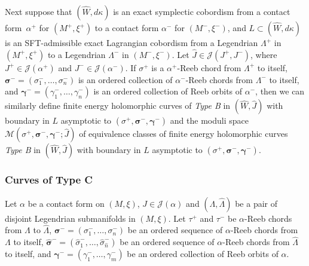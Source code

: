 \documentclass[JEP,XML,SOM,Unicode,NoFloatCountersInSection]{cedram}
\let\mathcal\mathscr
\theoremstyle{plain}
\theoremstyle{definition}
\numberwithin{equation}{subsection}
\let\bs\boldsymbol
\begin{document}
Next suppose that $(\widehat W,d\kappa)$ is an exact symplectic cobordism from a contact form~$\alpha^+$ for $(M^+,\xi^+)$ to a contact form $\alpha^-$ for $(M^-,\xi^-)$, and $L \subset (\widehat W,d\kappa)$ is an SFT-admissible exact Lagrangian cobordism from a Legendrian $\Lambda^+$ in $(M^+,\xi^+)$ to a Legendrian $\Lambda^-$ in $(M^-,\xi^-)$. Let $\widehat{J}\in \mathcal{J}(J^+,J^-)$, where $J^+ \in \mathcal{J}(\alpha^+)$ and $J^- \in \mathcal{J}(\alpha^-)$. If $\sigma^+$ is a $\alpha^+$-Reeb chord from $\Lambda^+$ to itself, $\bs\sigma^-=(\sigma^-_1,\dots,\sigma^-_n)$ is an ordered collection of $\alpha^-$-Reeb chords from $\Lambda^-$ to itself, and $\bs\gamma^-=(\gamma^-_1,\dots,\gamma^-_n)$ is an ordered collection of Reeb orbits of $\alpha^-$, then we can similarly define finite energy holomorphic curves of \emph{Type B} in $(\widehat W, \widehat{J})$ with boundary in $L$ asymptotic to $(\sigma^+,\bs\sigma^-,\bs\gamma^-)$ and the moduli space ${\mathcal{M}}(\sigma^+,\bs\sigma^-,\bs\gamma^-;\widehat{J})$ of equivalence classes of finite energy holomorphic curves \emph{Type B} in $(\widehat W, \widehat{J})$ with boundary in $L$ asymptotic to $(\sigma^+,\bs\sigma^-,\bs\gamma^-)$.

\subsubsection{Curves of {Type C}} \label{subsubsection: C}

Let $\alpha$ be a contact form on $(M,\xi)$, $J\in \mathcal{J}(\alpha)$ and $(\Lambda,\widehat{\Lambda})$ be a pair of disjoint Legendrian submanifolds in $(M,\xi)$. Let $\tau^+$ and $\tau^-$ be $\alpha$-Reeb chords from $\Lambda$ to $\widehat{\Lambda}$, $\bs\sigma^-=(\sigma^-_1,\dots,\sigma^-_n)$ be an ordered sequence of $\alpha$-Reeb chords from $\Lambda$ to itself, $\widehat{\bs\sigma}^-=(\widehat{\sigma}^-_1,\dots,\widehat{\sigma}^-_{\widehat{n}})$ be an ordered sequence of $\alpha$-Reeb chords from $\widehat{\Lambda}$ to itself, and $\bs\gamma^-=(\gamma^-_1,\dots,\gamma^-_m)$ be an ordered collection of Reeb orbits of $\alpha$.
\end{document}
